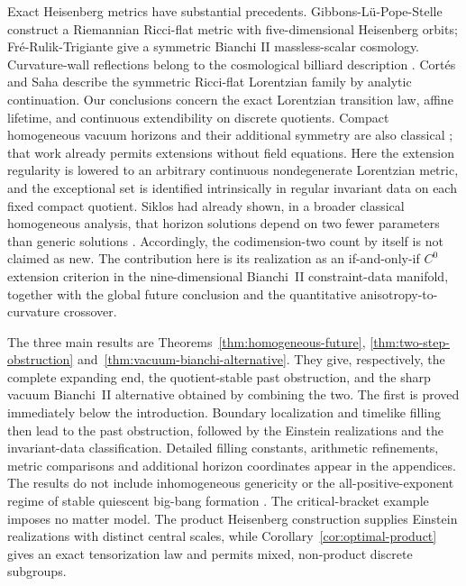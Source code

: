 \documentclass[10pt,a4paper]{article}
\numberwithin{equation}{section}
\theoremstyle{definition}
\theoremstyle{remark}
\begin{document}
Exact Heisenberg metrics have substantial precedents.  Gibbons-L\"u-Pope-Stelle
\cite[Section~4.1.1]{GibbonsLuPopeStelle2002} construct a Riemannian
Ricci-flat metric with five-dimensional Heisenberg orbits;
Fr\'e-Rulik-Trigiante \cite[Section~3.1.1]{FreRulikTrigiante2004} give
a symmetric Bianchi II massless-scalar cosmology.  Curvature-wall
reflections belong to the cosmological billiard description
\cite{DamourHenneauxNicolai2003}.  Cort\'es and Saha
\cite[Remark~4.6]{CortesSaha2022} describe the symmetric Ricci-flat
Lorentzian family by analytic continuation.  Our conclusions concern
the exact Lorentzian transition law, affine lifetime, and continuous
extendibility on discrete quotients.  Compact homogeneous vacuum horizons
and their additional symmetry are also classical
\cite{ChruscielRendall1995}; that work already permits extensions without
field equations.  Here the extension regularity is lowered to an
arbitrary continuous nondegenerate Lorentzian metric, and the exceptional
set is identified intrinsically in regular invariant data on each fixed
compact quotient.  Siklos had already shown, in a broader classical
homogeneous analysis, that horizon solutions depend on two fewer
parameters than generic solutions \cite{Siklos1978}.  Accordingly, the
codimension-two count by itself is not claimed as new.  The contribution
here is its realization as an if-and-only-if $C^0$ extension criterion in
the nine-dimensional Bianchi~II constraint-data manifold, together with
the global future conclusion and the quantitative
anisotropy-to-curvature crossover.

The three main results are Theorems~\ref{thm:homogeneous-future},
\ref{thm:two-step-obstruction} and~\ref{thm:vacuum-bianchi-alternative}.
They give, respectively, the complete expanding end, the quotient-stable
past obstruction, and the sharp vacuum Bianchi~II alternative obtained by
combining the two.  The first is proved immediately below the introduction.
Boundary localization and timelike filling then lead to the past
obstruction, followed by the Einstein realizations and the invariant-data
classification.
Detailed filling constants, arithmetic refinements, metric comparisons
and additional horizon coordinates appear in the appendices.
The results do not include inhomogeneous genericity or the
all-positive-exponent regime of stable quiescent big-bang formation
\cite{FournodavlosRodnianskiSpeck2023,OudeGroenigerPetersenRingstrom}.
The critical-bracket example imposes no matter model.  The product
Heisenberg construction supplies Einstein realizations with distinct
central scales, while Corollary~\ref{cor:optimal-product} gives an exact
tensorization law and permits mixed, non-product discrete subgroups.
\end{document}
